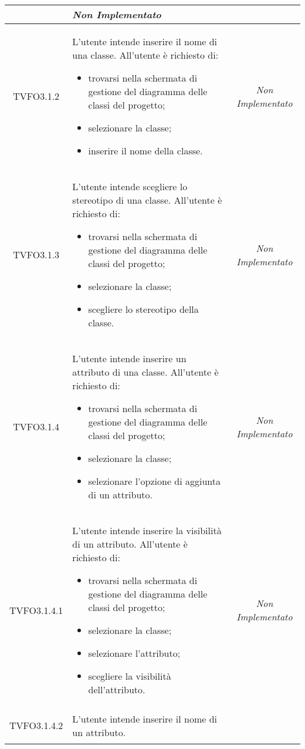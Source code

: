 \begin{longtable}{|c|>{}m{8cm}|c|}
\begin{itemize}
\end{itemize} & \textit{Non Implementato}\\ \hline
\hypertarget{TVFO3.1.2}{TVFO3.1.2} & L'utente intende inserire il nome di una classe.
All'utente è richiesto di:
\begin{itemize}
\item trovarsi nella schermata di gestione del diagramma delle classi del progetto;
\item selezionare la classe;
\item inserire il nome della classe.
\end{itemize} & \textit{Non Implementato}\\ \hline
\hypertarget{TVFO3.1.3}{TVFO3.1.3} & L'utente intende scegliere lo stereotipo di una classe.
All'utente è richiesto di:
\begin{itemize}
\item trovarsi nella schermata di gestione del diagramma delle classi del progetto;
\item selezionare la classe;
\item scegliere lo stereotipo della classe.
\end{itemize} & \textit{Non Implementato}\\ \hline
\hypertarget{TVFO3.1.4}{TVFO3.1.4} & L'utente intende inserire un attributo di una classe.
All'utente è richiesto di:
\begin{itemize}
\item trovarsi nella schermata di gestione del diagramma delle classi del progetto;
\item selezionare la classe;
\item selezionare l'opzione di aggiunta di un attributo.
\end{itemize} & \textit{Non Implementato}\\ \hline
\hypertarget{TVFO3.1.4.1}{TVFO3.1.4.1} & L'utente intende inserire la visibilità di un attributo.
All'utente è richiesto di:
\begin{itemize}
\item trovarsi nella schermata di gestione del diagramma delle classi del progetto;
\item selezionare la classe;
\item selezionare l'attributo;
\item scegliere la visibilità dell'attributo.
\end{itemize} & \textit{Non Implementato}\\ \hline
\hypertarget{TVFO3.1.4.2}{TVFO3.1.4.2} & L'utente intende inserire il nome di un attributo.

\end{longtable}

